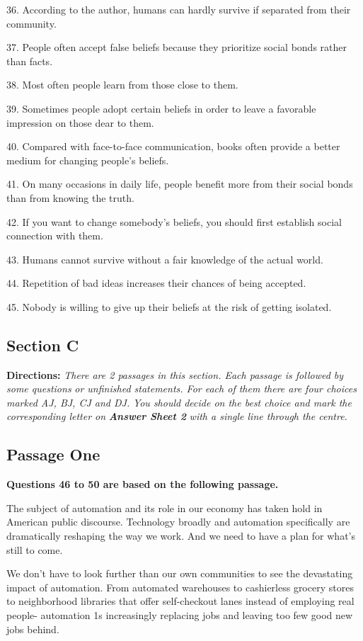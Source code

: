 \documentclass[UTF8,11pt]{ctexart}
\begin{document}
36. According to the author, humans can hardly survive if separated from their community.


37. People often accept false beliefs because they prioritize social bonds rather than facts.


38. Most often people learn from those close to them.


39. Sometimes people adopt certain beliefs in order to leave a favorable impression on those dear to them.


40. Compared with face-to-face communication, books often provide a better medium for changing people's beliefs.


41. On many occasions in daily life, people benefit more from their social bonds than from knowing the truth.


42. If you want to change somebody's beliefs, you should first establish social connection with them.


43. Humans cannot survive without a fair knowledge of the actual world.


44. Repetition of bad ideas increases their chances of being accepted.


45. Nobody is willing to give up their beliefs at the risk of getting isolated.


\subsection*{\textbf{Section C}}


\textbf{Directions: }\textit{There are 2 passages in this section. Each passage is followed by some questions} \textit{or unfinished statements. For each of them there are four choices marked AJ, BJ, CJ and DJ.} \textit{You should decide on the best choice and mark the corresponding letter on }\textbf{\textit{Answer Sheet 2}} \textit{with a single line through the centre.}


\subsection*{\textbf{Passage One}}


\textbf{Questions 46 to 50 are based on the following passage.}


The subject of automation and its role in our economy has taken hold in American public discourse. Technology broadly and automation specifically are dramatically reshaping the way we work. And we need to have a plan for what's still to come.


We don't have to look further than our own communities to see the devastating impact of automation. From automated warehouses to cashierless grocery stores to neighborhood libraries that offer self-checkout lanes instead of employing real people- automation 1s increasingly replacing jobs and leaving too few good new jobs behind.
\end{document}
